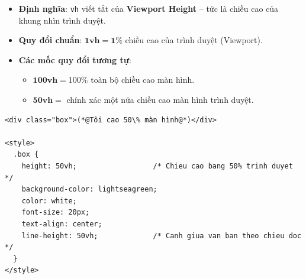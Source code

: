 \documentclass[11pt,oneside]{book}
\newcommand{\codeinline}[1]{\textcolor{accentOrange}{\texttt{#1}}}
\newcommand{\term}[1]{\textbf{\textcolor{primaryBlue}{#1}}}
\begin{document}
\begin{conceptBox}
\begin{itemize}[leftmargin=1.5em, itemsep=3pt, parsep=0pt]
    \item \textbf{Định nghĩa}: \codeinline{vh} viết tắt của \term{Viewport Height} -- tức là chiều cao của khung nhìn trình duyệt.
    \item \textbf{Quy đổi chuẩn}: $\mathbf{1\text{vh} = 1\%}$ chiều cao của trình duyệt (Viewport).
    \item \textbf{Các mốc quy đổi tương tự}:
    \begin{itemize}[leftmargin=1.2em, itemsep=2pt]
        \item $\mathbf{100\text{vh}} = 100\%$ toàn bộ chiều cao màn hình.
        \item $\mathbf{50\text{vh}} =$ chính xác một nửa chiều cao màn hình trình duyệt.
    \end{itemize}
\end{itemize}
\end{conceptBox}

\begin{codeWindow}
\begin{lstlisting}[language=HTML5]
<div class="box">(*@Tôi cao 50\% màn hình@*)</div>

<style>
  .box {
    height: 50vh;                  /* Chieu cao bang 50% trinh duyet */
    background-color: lightseagreen;
    color: white;
    font-size: 20px;
    text-align: center;
    line-height: 50vh;             /* Canh giua van ban theo chieu doc */
  }
</style>
\end{lstlisting}
\end{codeWindow}
\end{document}
